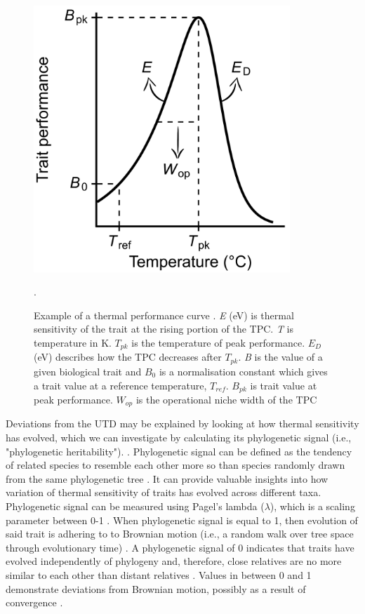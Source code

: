 \documentclass[11pt]{article}
\begin{document}
\begin{flushleft}
\newline
\newline
\begin{figure}[h]
    \centering
    \includegraphics[width=3.8in]{example_tpc.png}
    \caption{\label{fig:1} Example of a thermal performance curve \citep{kontopoulos2020adaptive}. \emph{E} (eV) is thermal sensitivity of the trait at the rising portion of the TPC. \emph{T} is temperature in K. \emph{$T_{pk}$} is the temperature of peak performance. \emph{$E_D$} (eV) describes how the TPC decreases after \emph{$T_{pk}$}. \emph{B} is the value of a given biological trait and \emph{$B_0$} is a normalisation constant which gives a trait value at a reference temperature, \emph{$T_{ref}$}. \emph{$B_{pk}$} is trait value at peak performance. \emph{$W_{op}$} is the operational niche width of the TPC}.
\end{figure}
\newline

Deviations from the UTD may be explained by looking at how thermal sensitivity has evolved, which we can investigate by calculating its phylogenetic signal (i.e., "phylogenetic heritability"). \citep{kontopoulos2020adaptive}. Phylogenetic signal can be defined as the tendency of related species to resemble each other more so than species randomly drawn from the same phylogenetic tree \citep{munkemuller2012measure}. It can provide valuable insights into how variation of thermal sensitivity of traits has evolved across different taxa. Phylogenetic signal can be measured using Pagel's lambda ($\lambda$), which is a scaling parameter between 0-1 \citep{pagel1999inferring}. When phylogenetic signal is equal to 1, then evolution of said trait is adhering to to Brownian motion (i.e., a random walk over tree space through evolutionary time) \citep{molina2017revisiting,munkemuller2012measure,pagel1999inferring}. A phylogenetic signal of 0 indicates that traits have evolved independently of phylogeny and, therefore, close relatives are no more similar to each other than distant relatives \citep{molina2017revisiting}. Values in between 0 and 1 demonstrate deviations from Brownian motion, possibly as a result of convergence \citep{kontopoulos2018use}.
\linebreak


\end{flushleft}
\end{document}
